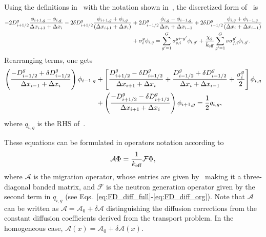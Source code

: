 Using the definitions in~ with the notation shown in~, the discretized form of~ is
\begin{equation}\label{eq:FD_diff_full}
\begin{split}
- 2D_{i+1/2}^g\frac{\phi_{i+1,g}-\phi_{i,g}}{\Delta x_{i+1} + \Delta x_i}
- 2\delta D_{i+1/2}^g\frac{\phi_{i+1,g}+\phi_{i,g}}{(\Delta x_{i+1}+\Delta x_i)}
&+ 2D_{i-1/2}^g\frac{\phi_{i,g}-\phi_{i-1,g}}{\Delta x_{i} + \Delta x_{i-1}}  
+ 2\delta D_{i-1/2}^g\frac{\phi_{i,g}+\phi_{i-1,g}}{(\Delta x_i+\Delta x_{i-1})} \\
&+ \sigma_{i}^g \phi_{i,g} 
= \sum\limits_{g'=1}^G \sigma_{s,i}^{g\leftarrow g'}\phi_{i,g'}
+ \frac{\chi_g}{{k_{\textrm{\scriptsize{eff}}}}}\sum\limits_{g'=1}^G
 \nu\sigma_{f,i}^{g'}\phi_{i,g'}.
\end{split}
\end{equation}
Rearranging terms, one gets
\begin{equation}\label{eq:FD_diff_org}
\begin{split}
\left(
\frac{-D_{i-1/2}^g + \delta D_{i-1/2}^g }{\Delta x_{i-1}+\Delta x_{i}}
\right) \phi_{i-1,g}
&+ \left[
\frac{D_{i+1/2}^g - \delta D_{i+1/2}^g}{\Delta x_{i+1}+\Delta x_i}
+\frac{D_{i-1/2}^g + \delta D_{i-1/2}^g}{\Delta x_{i}+\Delta x_{i-1}}
+\frac{\sigma_{i}^g}{2}
\right] \phi_{i,g} \\
&+ \left(
\frac{-D_{i+1/2}^g -\delta D_{i+1/2}^g }{\Delta x_{i+1}+\Delta x_{i}}
\right) \phi_{i+1,g} = \frac{1}{2}q_{i,g},
\end{split}
\end{equation}
where $q_{i,g}$ is the RHS of~.

These equations can be formulated in operators notation according to
\begin{equation}\label{eq:op-not}
\mathcal{A}\Phi=\frac{1}{{k_{\textrm{\scriptsize{eff}}}}}\mathcal{F}\Phi,
\end{equation}
where $\mathcal{A}$ is the migration operator, whose entries are given by~ making it a three-diagonal banded matrix, and $\mathcal{F}$ is the neutron generation operator given by the second term in $q_{i,g}$ (see Eqs.~\ref{eq:FD_diff_full}-\ref{eq:FD_diff_org}). Note that $\mathcal{A}$ can be written as $\mathcal{A}=\mathcal{A}_0+\delta\mathcal{A}$ distinguishing the diffusion corrections from the constant diffusion coefficients derived from the transport problem. In the homogeneous case, $\mathcal{A}(x)=\mathcal{A}_0+\delta\mathcal{A}(x)$.
%
%
